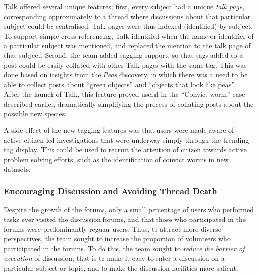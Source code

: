 \documentclass{sigchi}
\begin{document}
Talk offered several unique features; first, every subject had a unique \emph{talk page}, corresponding approximately to a thread where discussions about that particular subject could be centralised.  Talk pages were thus indexed (identified) by subject.  To support simple cross-referencing, Talk identified when the name or identifier of a particular subject was mentioned, and replaced the mention to the talk page of that subject.  Second, the team added tagging support, so that tags added to a post could be easily collated with other Talk pages with the same tag. This was done based on insights from the \emph{Peas} discovery, in which there was a need to be able to collect posts about ``green objects'' and ``objects that look like peas''.  After the launch of Talk, this feature proved useful in the ``Convict worm'' case described earlier, dramatically simplifying the process of collating posts about the possible new species.  

A side effect of the new tagging features was that users were made aware of active citizen-led investigations that were underway simply through the trending tag display.  This could be used to recruit the attention of citizen towards active problem solving efforts, such as the identification of convict worms in new datasets.

\subsubsection{Encouraging Discussion and Avoiding Thread Death}
	

Despite the growth of the forums, only a small percentage of users who performed tasks ever visited the discussion forums, and that those who participated in the forums were predominantly regular users. Thus, to attract more diverse perspectives, the team sought to increase the proportion of volunteers who participated in the forums.  To do this, the team sought to \emph{reduce the barrier of execution} of discussion, that is to make it easy to enter a discussion on a particular subject or topic, and to make the discussion facilities more salient\cite{norman2002design}.  
\end{document}
